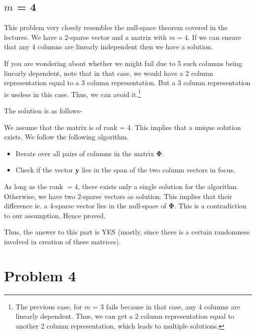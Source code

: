 \documentclass[a4paper,11pt]{article}
\numberwithin{definition}{section}
\numberwithin{mytheorem}{subsection}
\begin{document}
\subsection{$m$ = 4}

This problem very closely resembles the null-space theorem covered in the lectures. We have a 2-sparse vector and a matrix with $m = 4$. If we can ensure that any 4 columns are linearly independent then we have a solution. 

If you are wondering about whether we might fail due to 5 such columns being linearly dependent, note that in that case, we would have a 2 column representation equal to a 3 column representation. But a 3 column representation is useless in this case. Thus, we can avoid it.\footnote{The previous case, for $m$ = 3 fails because in that case, any 4 columns are linearly dependent. Thus, we can get a 2 column representation equal to another 2 column representation, which leads to multiple solutions.}

The solution is as follows-

We assume that the matrix is of rank = 4. This implies that a unique solution exists. We follow the following algorithm.

\begin{itemize}
    \item Iterate over all pairs of columns in the matrix $\boldsymbol{\Phi}$.
    \item Check if the vector $\boldsymbol{y}$ lies in the span of the two column vectors in focus.
\end{itemize}

As long as the rank $= 4$, there exists only a single solution for the algorithm.
Otherwise, we have two 2-sparse vectors as solution. This implies that their difference ie. a 4-sparse vector lies in the null-space of $\boldsymbol{\Phi}$. This is a contradiction to our assumption. Hence proved.

Thus, the answer to this part is YES (mostly, since there is a certain randomness involved in creation of these matrices).


\newpage


\section{Problem 4}
\end{document}
